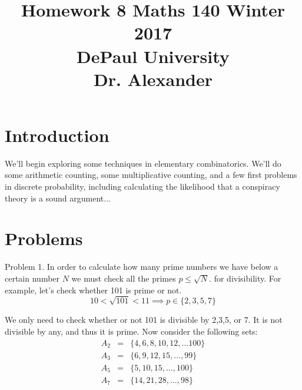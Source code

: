 \documentclass[16 pt]{amsart}
\theoremstyle{definition}
\theoremstyle{remark}
\numberwithin{equation}{subsection}
\begin{document}
\title{Homework 8 Maths 140 Winter 2017 \\ DePaul University\\Dr. Alexander}
\maketitle

\section{Introduction}
We'll begin exploring some techniques in elementary combinatorics.  We'll do some arithmetic counting, some multiplicative counting, and a few first problems in discrete probability, including calculating the likelihood that a conspiracy theory is a sound argument...

\section{Problems}


Problem 1.  In order to calculate how many prime numbers we have below a certain number $N$ we must check all the primes $p\le \sqrt{N}$. for divisibility.  For example, let's check whether 101 is prime or not.  
\[
10< \sqrt{101} < 11 \implies p\in\{2,3,5,7\}
\]

We only need to check whether or not 101 is divisible by 2,3,5, or 7.  It is not divisible by any, and thus it is prime. Now consider the following sets:
\begin{eqnarray}
A_2 &=& \{ 4,6,8,10,12,\dots 100\} \nonumber \\
A_3 & = & \{6,9,12,15,\dots, 99 \} \nonumber \\
A_5 & = & \{ 5,10,15,\dots, 100\} \nonumber \\
A_7 & = & \{14,21,28,\dots, 98 \} \nonumber
\end{eqnarray}
\end{document}
